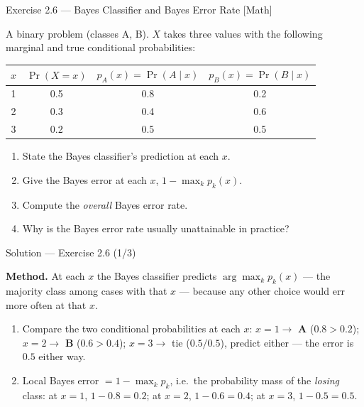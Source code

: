 \documentclass[aspectratio=169,11pt]{beamer}
\begin{document}
\begin{frame}{Exercise 2.6 --- Bayes Classifier and Bayes Error Rate [Math]}
\begin{exercise}
A binary problem (classes A, B). $X$ takes three values with the
following marginal and true conditional probabilities:
\begin{center}\footnotesize
\begin{tabular}{cccc}
\toprule
$x$ & $\Pr(X=x)$ & $p_A(x)=\Pr(A\mid x)$ & $p_B(x)=\Pr(B\mid x)$ \\
\midrule
1 & 0.5 & 0.8 & 0.2 \\
2 & 0.3 & 0.4 & 0.6 \\
3 & 0.2 & 0.5 & 0.5 \\
\bottomrule
\end{tabular}
\end{center}
\begin{enumerate}
  \item State the Bayes classifier's prediction at each $x$.
  \item Give the Bayes error at each $x$, $1-\max_k p_k(x)$.
  \item Compute the \emph{overall} Bayes error rate.
  \item Why is the Bayes error rate usually unattainable in practice?
\end{enumerate}
\end{exercise}
\end{frame}

\begin{frame}{Solution --- Exercise 2.6 (1/3)}
\begin{solutionbox}
\textbf{Method.} At each $x$ the Bayes classifier predicts
$\arg\max_k p_k(x)$ --- the majority class among cases with that $x$
--- because any other choice would err more often at that $x$.
\begin{enumerate}
  \item Compare the two conditional probabilities at each $x$:
        $x=1\to$ \textbf{A} ($0.8>0.2$); $x=2\to$ \textbf{B}
        ($0.6>0.4$); $x=3\to$ tie ($0.5/0.5$), predict either --- the
        error is $0.5$ either way.
  \item Local Bayes error $=1-\max_k p_k$, i.e.\ the probability mass
        of the \emph{losing} class: at $x=1$, $1-0.8=0.2$; at
        $x=2$, $1-0.6=0.4$; at $x=3$, $1-0.5=0.5$.
\end{enumerate}
\end{solutionbox}
\end{frame}
\end{document}
